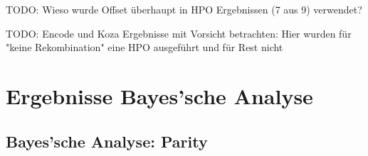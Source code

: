 TODO: Wieso wurde Offset überhaupt in HPO Ergebnissen (7 aus 9) verwendet?

TODO: Encode und Koza Ergebnisse mit Vorsicht betrachten: Hier wurden für "keine Rekombination" eine HPO ausgeführt und für Rest nicht





\section{Ergebnisse Bayes'sche Analyse}
\label{sec:ergebnisseBayes}

\subsection{Bayes'sche Analyse: Parity}
\label{subsec:bayesParity}

